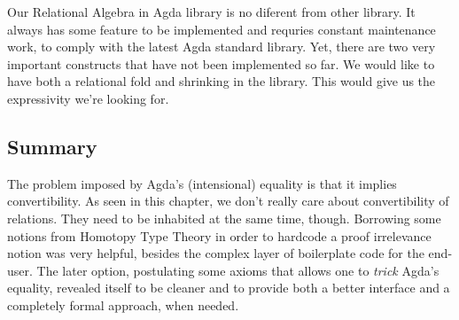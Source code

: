 Our Relational Algebra in Agda library is no diferent from other library. It always has some
feature to be implemented and requries constant maintenance work, to comply with the latest
Agda standard library. Yet, there are two very important constructs that have not been implemented so far.
We would like to have both a relational fold and shrinking\cite{Mu2012} in the library. This would give us the
expressivity we're looking for.

\subsection{Summary}

The problem imposed by Agda's (intensional) equality is that it implies
convertibility. As seen in this chapter, we don't really care about convertibility of relations.
They need to be inhabited at the same time, though. 
Borrowing some notions from Homotopy Type Theory\cite{hottbook}
in order to hardcode a proof irrelevance notion was very helpful, besides the complex layer of boilerplate
code for the end-user. The later option, postulating some axioms that allows one to \emph{trick}
Agda's equality, revealed itself to be cleaner and to provide both a better interface
and a completely formal approach, when needed.


